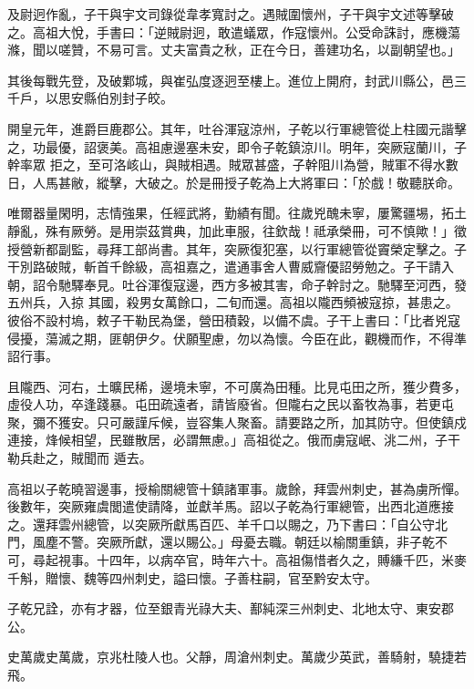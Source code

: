\begin{pinyinscope}
 及尉迥作亂，子干與宇文司錄從韋孝寬討之。遇賊圍懷州，子干與宇文述等擊破之。高祖大悅，手書曰：「逆賊尉迥，敢遣蟻眾，作寇懷州。公受命誅討，應機蕩滌，聞以嗟贊，不易可言。丈夫富貴之秋，正在今日，善建功名，以副朝望也。」



 其後每戰先登，及破鄴城，與崔弘度逐迥至樓上。進位上開府，封武川縣公，邑三千戶，以思安縣伯別封子皎。



 開皇元年，進爵巨鹿郡公。其年，吐谷渾寇涼州，子乾以行軍總管從上柱國元諧擊之，功最優，詔褒美。高祖慮邊塞未安，即令子乾鎮涼川。明年，突厥寇蘭川，子幹率眾
 拒之，至可洛峐山，與賊相遇。賊眾甚盛，子幹阻川為營，賊軍不得水數日，人馬甚敝，縱擊，大破之。於是冊授子乾為上大將軍曰：「於戲！敬聽朕命。



 唯爾器量閑明，志情強果，任經武將，勤績有聞。往歲兇醜未寧，屢驚疆埸，拓土靜亂，殊有厥勞。是用崇茲賞典，加此車服，往欽哉！祗承榮冊，可不慎歟！」徵授營新都副監，尋拜工部尚書。其年，突厥復犯塞，以行軍總管從竇榮定擊之。子干別路破賊，斬首千餘級，高祖嘉之，遣通事舍人曹威齎優詔勞勉之。子干請入朝，詔令馳驛奉見。吐谷渾復寇邊，西方多被其害，命子幹討之。馳驛至河西，發五州兵，入掠
 其國，殺男女萬餘口，二旬而還。高祖以隴西頻被寇掠，甚患之。彼俗不設村塢，敕子干勒民為堡，營田積穀，以備不虞。子干上書曰：「比者兇寇侵擾，蕩滅之期，匪朝伊夕。伏願聖慮，勿以為懷。今臣在此，觀機而作，不得準詔行事。



 且隴西、河右，土曠民稀，邊境未寧，不可廣為田種。比見屯田之所，獲少費多，虛役人功，卒逢踐暴。屯田疏遠者，請皆廢省。但隴右之民以畜牧為事，若更屯聚，彌不獲安。只可嚴謹斥候，豈容集人聚畜。請要路之所，加其防守。但使鎮戍連接，烽候相望，民雖散居，必謂無慮。」高祖從之。俄而虜寇岷、洮二州，子干勒兵赴之，賊聞而
 遁去。



 高祖以子乾曉習邊事，授榆關總管十鎮諸軍事。歲餘，拜雲州刺史，甚為虜所憚。後數年，突厥雍虞閭遣使請降，並獻羊馬。詔以子乾為行軍總管，出西北道應接之。還拜雲州總管，以突厥所獻馬百匹、羊千口以賜之，乃下書曰：「自公守北門，風塵不警。突厥所獻，還以賜公。」母憂去職。朝廷以榆關重鎮，非子乾不可，尋起視事。十四年，以病卒官，時年六十。高祖傷惜者久之，賻縑千匹，米麥千斛，贈懷、魏等四州刺史，謚曰懷。子善柱嗣，官至黔安太守。



 子乾兄詮，亦有才器，位至銀青光祿大夫、鄯純深三州刺史、北地太守、東安郡公。



 史萬歲史萬歲，京兆杜陵人也。父靜，周滄州刺史。萬歲少英武，善騎射，驍捷若飛。




\end{pinyinscope}

